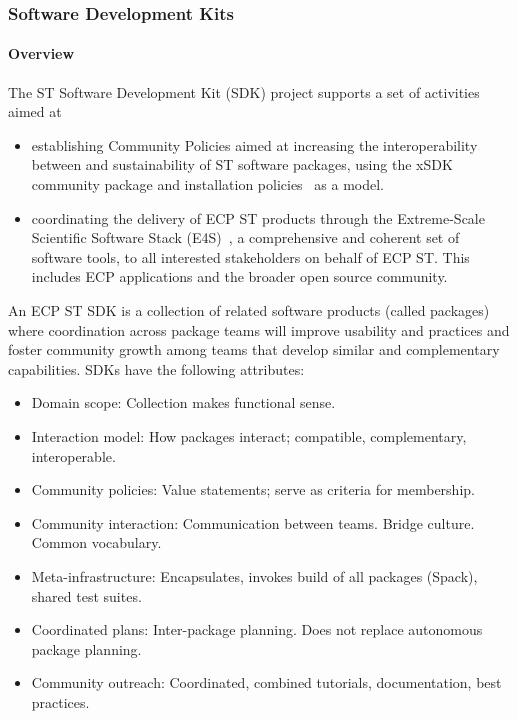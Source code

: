 \subsubsection{ Software Development Kits} \label{subsubsect:ecosystem-sdk}

\paragraph{Overview} The ST Software Development Kit (SDK) project supports a set of activities aimed at
\begin{itemize}
\item establishing Community Policies aimed at increasing the interoperability between and sustainability of ST software packages, using the xSDK~\cite{xsdk:homepage} community package and installation policies~\cite{xsdk-policies:homepage} as a model.
\item coordinating the delivery of ECP ST products through the Extreme-Scale Scientific Software Stack (E4S)~\cite{e4s:homepage}, a comprehensive and coherent set of software tools, to all interested stakeholders on behalf of ECP ST. This includes ECP applications and the broader open source community.
\end{itemize}

An ECP ST SDK is a collection of related software products (called packages) where coordination across package teams will improve usability and practices and foster community growth among teams that develop similar and complementary capabilities.  SDKs have the following attributes:
\begin{itemize}
\item Domain scope: Collection makes functional sense.
\item Interaction model: How packages interact; compatible, complementary, interoperable.
\item Community policies: Value statements; serve as criteria for membership.
\item Community interaction: Communication between teams. Bridge culture. Common vocabulary.
\item Meta-infrastructure: Encapsulates, invokes build of all packages (Spack), shared test suites.
\item Coordinated plans: Inter-package planning. Does not replace autonomous package planning.
\item Community outreach: Coordinated, combined tutorials, documentation, best practices.
\end{itemize}

